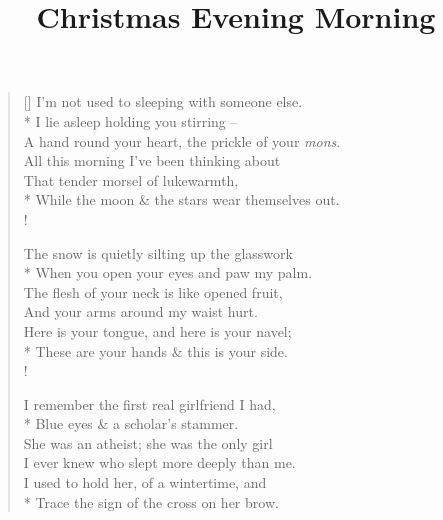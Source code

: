 \documentclass{amsart}
\title{Christmas Evening Morning}
\newcommand{\poeticmarginnote}[1]{\marginnote{\footnotesize #1}}
\begin{document}
\maketitle

\thispagestyle{empty}

\begin{verse}[\versewidth]
I'm not used to sleeping with someone else.\\*
\vin I lie  asleep holding you stirring --\poeticmarginnote{DM}\\
A hand round your heart, the prickle of your \textit{mons}.\\
\vin All this morning I've been thinking about\\
That tender morsel of lukewarmth,\\*
\vin While the moon \& the stars wear themselves out.\nobreak\\!

The snow is quietly silting up the glasswork\\*
\vin When you open your eyes and paw my palm.\\
The flesh of your neck is like opened fruit,\\
\vin And your arms around my waist hurt.\\
Here is your tongue, and here is your navel;\\*
\vin These are your hands \& this is your side.\\!

I remember the first real girlfriend I had,\poeticmarginnote{HR}\\*
\vin Blue eyes \& a scholar's stammer.\\
She was an atheist; she was the only girl\\
\vin I ever knew who slept more deeply than me.\\
I used to hold her, of a wintertime, and\\*
\vin Trace the sign of the cross on her brow.
\end{verse}
\end{document}
